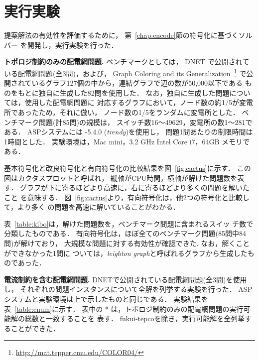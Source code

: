 \section{実行実験}\label{chap:exp}


提案解法の有効性を評価するために，
第~\ref{chap:encode}節の符号化に基づくソルバー
を開発し，実行実験を行った．

\textbf{トポロジ制約のみの配電網問題.}
ベンチマークとしては，
DNET%
で公開されている配電網問題(全3問)，および，
Graph Coloring and its Generalization~\footnote{\url{http://mat.tepper.cmu.edu/COLOR04/}}
で公開されているグラフ127個の中から，連結グラフで辺の数が50,000以下である
ものをもとに独自に生成した82問を使用した．
なお，独自に生成した問題については，使用した配電網問題に
対応するグラフにおいて，ノード数の約1/5が変電所であったため，それに倣い，
ノード数の1/5をランダムに変電所とした．
ベンチマーク問題(計85問)の規模は，
スイッチ数16〜49629，変電所の数1〜281である．
%
ASPシステムには {\clingo}-5.4.0 (\textit{trendy})を使用し，
問題1問あたりの制限時間は1時間とした．
実験環境は，Mac mini，3.2 GHz Intel Core i7，64GB メモリである．

基本符号化と改良符号化と有向符号化の比較結果を図~\ref{fig:cactus}に示す．
この図はカクタスプロットと呼ばれ，
縦軸がCPU時間，横軸が解けた問題数を表す．
グラフが下に寄るほどより高速に，右に寄るほどより多くの問題を解いたこと
を意味する．
図~\ref{fig:cactus}より，有向符号化は，他2つの符号化と比較して，より多く
の問題を高速に解いていることがわかる．

表~\ref{table:kibo}は，解けた問題数を，ベンチマーク問題に含まれるスイッ
チ数で分類したものである．
有向符号化は，ほぼ全てのベンチマーク問題(85問中84問)が解けており，
大規模な問題に対する有効性が確認できた. なお，解くことができなかった1問に
ついては，\textit{leighton graph}と呼ばれるグラフから生成したものであった．

\textbf{電流制約を含む配電網問題.}
DNETで公開されている配電網問題(全3問)を使用し，
それぞれの問題インスタンスについて全解を列挙する実験を行った．
ASPシステムと実験環境は上で示したものと同じである．
実験結果を表~\ref{table:enum}に示す．
表中の * は，トポロジ制約のみの配電網問題の実行可能解の総数と一致することを
表す．
\textsf{fukui-tepco}を除き，実行可能解を全列挙することができた．

